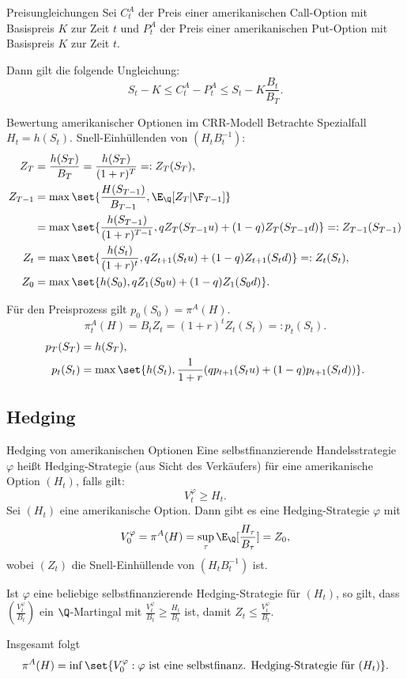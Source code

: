 \begin{karte}{Preisungleichungen}
Sei \(C_t^A\) der Preis einer amerikanischen Call-Option mit Basispreis \(K\) zur Zeit \(t\)
und \(P_t^A\) der Preis einer amerikanischen Put-Option mit Basispreis \(K\) zur Zeit \(t\).

Dann gilt die folgende Ungleichung: 
\[ S_t - K \leq C_t^A - P_t^A \leq S_t - K \frac{B_t}{B_T}. \]
\end{karte}

\begin{karte}{Bewertung amerikanischer Optionen im CRR-Modell}
Betrachte Spezialfall \(H_t = h(S_t)\). Snell-Einhüllenden von \((H_t B_t^{-1})\): 
\begin{align*}
    Z_T &= \frac{h(S_T)}{B_T} = \frac{h(S_T)}{(1+r)^T} =: Z_T(S_T), \\
    Z_{T-1} &= \max\set{ \frac{H(S_{T-1})}{B_{T-1}}, \E_\Q[Z_T | \F_{T-1}] } \\
    &= \max \set{ \frac{h(S_{T-1})}{(1+r)^{T-1}}, q Z_T(S_{T-1} u) + (1-q) Z_T(S_{T-1}d) } =: Z_{T-1}(S_{T-1}) \\
    Z_t &= \max\set{ \frac{h(S_t)}{(1+r)^t}, q Z_{t+1}(S_t u) + (1-q) Z_{t+1}(S_t d) } =: Z_t(S_t), \\
    Z_0 &= \max \set{ h(S_0), q Z_1 (S_0 u) + (1-q) Z_1(S_0 d) }.
\end{align*}

Für den Preisprozess gilt \(p_0(S_0) = \pi^A(H)\). 
\[ \pi_t^A(H) = B_t Z_t = (1+r)^t Z_t(S_t) =: p_t(S_t). \]
\begin{align*}
    p_T(S_T) &= h(S_T), \\
    p_t(S_t) &= \max \set{ h(S_t), \frac{1}{1+r} (qp_{t+1}(S_t u) + (1-q) p_{t+1}(S_t d))}.
\end{align*}
\end{karte}

\subsection{Hedging}

\begin{karte}{Hedging von amerikanischen Optionen}
Eine selbstfinanzierende Handelsstrategie \(\varphi\) heißt Hedging-Strategie 
(aus Sicht des Verkäufers) für eine amerikanische Option \((H_t)\), falls gilt: 
\[ V_t^\varphi \geq H_t. \]
Sei \((H_t)\) eine amerikanische Option. Dann gibt es eine Hedging-Strategie \(\varphi\) 
mit 
\[ V_0^\varphi = \pi^A(H) = \sup_\tau \E_\Q[\frac{H_\tau}{B_\tau}] = Z_0, \]
wobei \((Z_t)\) die Snell-Einhüllende von \((H_t B_t^{-1})\) ist.

Ist \(\varphi\) eine beliebige selbstfinanzierende Hedging-Strategie für \((H_t)\), 
so gilt, dass \(( \frac{V_t^\varphi}{B_t} )\) ein \(\Q\)-Martingal mit 
\(\frac{V_t^\varphi}{B_t} \geq \frac{H_t}{B_t}\) ist, damit \(Z_t \leq \frac{V_t^\varphi}{B_t}\). 

Insgesamt folgt 
\[ \pi^A(H) = \inf \set{ V_0^\varphi: \varphi \text{ ist eine selbstfinanz. Hedging-Strategie für } (H_t) }. \]
\end{karte}

